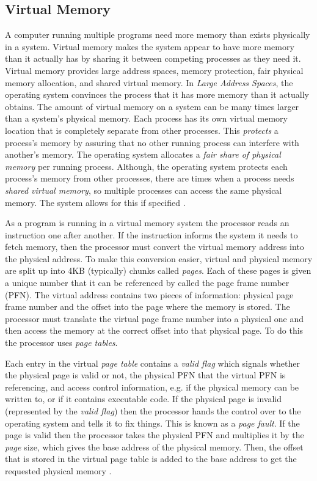 \documentclass[onecolumn,draftclsnofoot, 10pt, compsoc]{IEEEtran}
\begin{document}
	\subsection{Virtual Memory}
		A computer running multiple programs need more memory than exists physically in a system. 
		Virtual memory makes the system appear to have more memory than it actually has by sharing it between competing processes as they need it.
		Virtual memory provides large address spaces, memory protection, fair physical memory allocation, and shared virtual memory.
		In\textit{ Large Address Spaces}, the operating system convinces the process that it has more memory than it actually obtains.
		The amount of virtual memory on a system can be many times larger than a system's physical memory.
		Each process has its own virtual memory location that is completely separate from other processes. This \textit{protects} a process's memory by assuring that no other running process can interfere with another's memory. 
		The operating system allocates a \textit{fair share of physical memory} per running process.
		Although, the operating system protects each process's memory from other processes, there are times when a process needs \textit{shared virtual memory}, so multiple processes can access the same physical memory.
		The system allows for this if specified \cite{linuxMM}.
		
		As a program is running in a virtual memory system the processor reads an instruction one after another.
		If the instruction informs the system it needs to fetch memory, then the processor must convert the virtual memory address into the physical address.
		To make this conversion easier, virtual and physical memory are split up into 4KB (typically) chunks called \textit{pages}.
		Each of these pages is given a unique number that it can be referenced by called the page frame number (PFN).
		The virtual address contains two pieces of information: physical page frame number and the offset into the page where the memory is stored.
		The processor must translate the virtual page frame number into a physical one and then access the memory at the correct offset into that physical page. To do this the processor uses \textit{page tables}.
		
		Each entry in the virtual \textit{page table}  contains a \textit{valid flag} which signals whether the physical page is valid or not, the physical PFN that the virtual PFN is referencing, and access control information, e.g. if the physical memory can be written to, or if it contains executable code.	
		If the physical page is invalid (represented by the \textit{valid flag}) then the processor hands the control over to the operating system and tells it to fix things.
		This is known as a \textit{page fault}.
		If the page is valid then the processor takes the physical PFN and multiplies it by the \textit{page} size, which gives the base address of the physical memory.
		Then, the offset that is stored in the virtual page table is added to the base address to get the requested physical memory \cite{linuxMM}.
	
\end{document}
